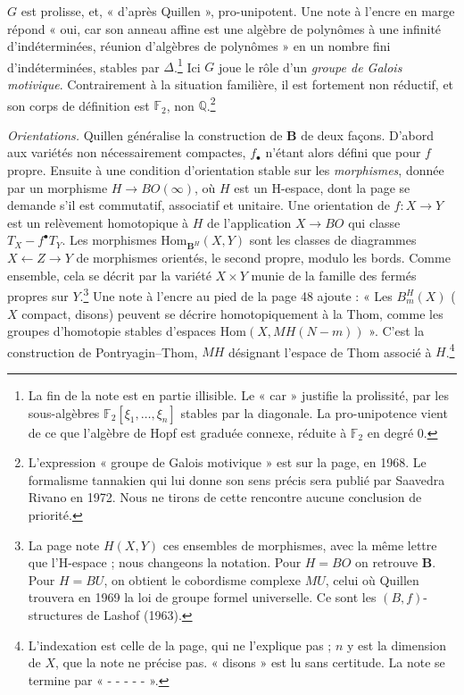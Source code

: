 \documentclass[11pt,a4paper]{article}
\begin{document}
$G$ est prolisse, et, « d'après Quillen », pro-unipotent. Une note à l'encre en
marge répond « oui, car son anneau affine est une algèbre de polynômes à une
infinité d'indéterminées, réunion d'algèbres de polynômes » en un nombre fini
d'indéterminées, stables par $\Delta$.\footnote{La fin de la note est en partie
illisible. Le « car » justifie la prolissité, par les sous-algèbres
$\mathbb{F}_2[\xi_1, \ldots, \xi_n]$ stables par la diagonale. La
pro-unipotence vient de ce que l'algèbre de Hopf est graduée connexe, réduite à
$\mathbb{F}_2$ en degré 0.} Ici $G$ joue le rôle d'un \emph{groupe de Galois
motivique}. Contrairement à la situation familière, il est fortement non
réductif, et son corps de définition est $\mathbb{F}_2$, non
$\mathbb{Q}$.\footnote{L'expression « groupe de Galois motivique » est sur la
page, en 1968. Le formalisme tannakien qui lui donne son sens précis sera
publié par Saavedra Rivano en 1972. Nous ne tirons de cette rencontre aucune
conclusion de priorité.}

\emph{Orientations.} Quillen généralise la construction de $\mathbf{B}$ de deux
façons. D'abord aux variétés non nécessairement compactes, $f_\bullet$ n'étant
alors défini que pour $f$ propre. Ensuite à une condition d'orientation stable
sur les \emph{morphismes}, donnée par un morphisme $H \to BO(\infty)$, où $H$
est un H-espace, dont la page se demande s'il est commutatif, associatif et
unitaire. Une orientation de $f : X \to Y$ est un relèvement homotopique à $H$
de l'application $X \to BO$ qui classe $T_X - f^{\bullet}T_Y$. Les morphismes
$\mathrm{Hom}_{\mathbf{B}^{H}}(X, Y)$ sont les classes de diagrammes $X
\leftarrow Z \to Y$ de morphismes orientés, le second propre, modulo les bords.
Comme ensemble, cela se décrit par la variété $X \times Y$ munie de la famille
des fermés propres sur $Y$.\footnote{La page note $H(X,Y)$ ces ensembles de
morphismes, avec la même lettre que l'H-espace ; nous changeons la notation.
Pour $H = BO$ on retrouve $\mathbf{B}$. Pour $H = BU$, on obtient le
cobordisme complexe $MU$, celui où Quillen trouvera en 1969 la loi de groupe
formel universelle. Ce sont les $(B,f)$-structures de Lashof (1963).} Une note à
l'encre au pied de la page 48 ajoute : « Les $B^{H}_m(X)$ ($X$ compact,
disons) peuvent se décrire homotopiquement à la Thom, comme les groupes
d'homotopie stables d'espaces $\mathrm{Hom}(X, MH(N - m))$ ». C'est la
construction de Pontryagin--Thom, $MH$ désignant l'espace de Thom associé à
$H$.\footnote{L'indexation est celle de la page, qui ne l'explique pas ; $n$
y est la dimension de $X$, que la note ne précise pas. « disons » est lu sans
certitude. La note se termine par « - - - - - ».}
\end{document}
